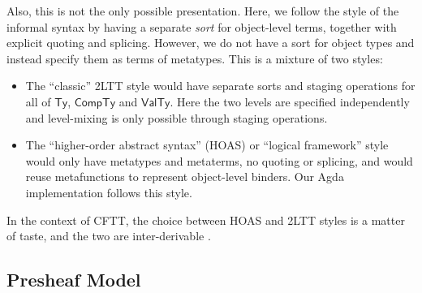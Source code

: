 \documentclass[acmsmall]{acmart}
\newcommand{\msf}[1]{{\mathsf{#1}}}
\newcommand{\VTy}{\msf{ValTy}}
\newcommand{\Ty}{\msf{Ty}}
\newcommand{\CTy}{\msf{CompTy}}
\theoremstyle{remark}
\begin{document}
Also, this is not the only possible presentation. Here, we follow the style of
the informal syntax by having a separate \emph{sort} for object-level terms,
together with explicit quoting and splicing. However, we do not have a sort for
object types and instead specify them as terms of metatypes. This is a mixture
of two styles:
\begin{itemize}
\item The ``classic'' 2LTT style would have separate sorts and staging
  operations for all of $\Ty$, $\CTy$ and $\VTy$. Here the two levels are
  specified independently and level-mixing is only possible through staging
  operations.
\item The ``higher-order abstract syntax'' (HOAS) or ``logical framework'' style
  would only have metatypes and metaterms, no quoting or splicing, and would
  reuse metafunctions to represent object-level binders. Our Agda implementation
  follows this style.
\end{itemize}
In the context of CFTT, the choice between HOAS and 2LTT styles is a matter of
taste, and the two are inter-derivable \cite[Section
  3.3]{DBLP:journals/corr/abs-2302-08837}.

\subsection{Presheaf Model}
\end{document}
